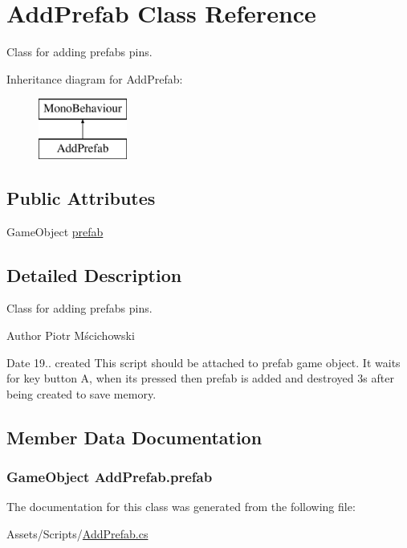 \hypertarget{class_add_prefab}{}\section{Add\+Prefab Class Reference}
\label{class_add_prefab}


Class for adding prefabs pins.  


Inheritance diagram for Add\+Prefab\+:\begin{figure}[H]
\begin{center}
\leavevmode
\includegraphics[height=2.000000cm]{class_add_prefab}
\end{center}
\end{figure}
\subsection*{Public Attributes}
\begin{DoxyCompactItemize}
\item 
Game\+Object \hyperlink{class_add_prefab_aee46a2acbc563ebf804e9dfbe3d67a05}{prefab}
\end{DoxyCompactItemize}


\subsection{Detailed Description}
Class for adding prefabs pins. 

\begin{DoxyAuthor}{Author}
Piotr Mścichowski 
\end{DoxyAuthor}
\begin{DoxyDate}{Date}
19.. created This script should be attached to prefab game object. It waits for key button A, when it\textquotesingle{}s pressed then prefab is added and destroyed 3s after being created to save memory. 
\end{DoxyDate}


\subsection{Member Data Documentation}
\hypertarget{class_add_prefab_aee46a2acbc563ebf804e9dfbe3d67a05}{}
\subsubsection[{prefab}]{\setlength{\rightskip}{0pt plus 5cm}Game\+Object Add\+Prefab.\+prefab}\label{class_add_prefab_aee46a2acbc563ebf804e9dfbe3d67a05}


The documentation for this class was generated from the following file\+:\begin{DoxyCompactItemize}
\item 
Assets/\+Scripts/\hyperlink{_add_prefab_8cs}{Add\+Prefab.\+cs}\end{DoxyCompactItemize}
